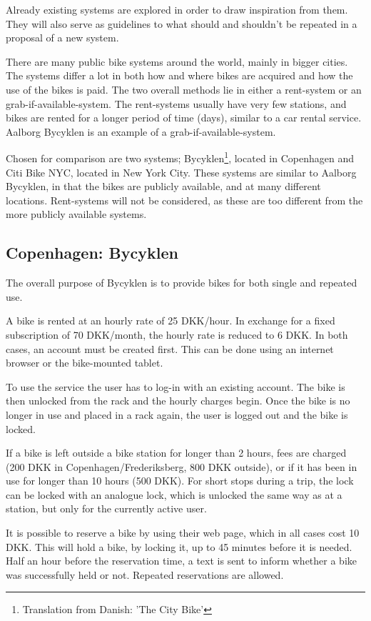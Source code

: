 Already existing systems are explored in order to draw inspiration from them.
They will also serve as guidelines to what should and shouldn't be repeated in a proposal of a new system.

There are many public bike systems around the world, mainly in bigger cities.
The systems differ a lot in both how and where bikes are acquired and how the use of the bikes is paid.
The two overall methods lie in either a rent-system or an grab-if-available-system.
The rent-systems usually have very few stations, and bikes are rented for a longer period of time (days), similar to a car rental service.
Aalborg Bycyklen is an example of a grab-if-available-system.

Chosen for comparison are two systems; Bycyklen\footnote{Translation from Danish: 'The City Bike'}, located in Copenhagen and Citi Bike NYC, located in New York City.
These systems are similar to Aalborg Bycyklen, in that the bikes are publicly available, and at many different locations.
Rent-systems will not be considered, as these are too different from the more publicly available systems.

\subsection{Copenhagen: Bycyklen}
The overall purpose of Bycyklen\cite{cph_bycyklen}\cite{cph_bycyklen_conditions} is to provide bikes for both single and repeated use.

A bike is rented at an hourly rate of 25 DKK/hour.
In exchange for a fixed subscription of 70 DKK/month, the hourly rate is reduced to 6 DKK.
In both cases, an account must be created first.
This can be done using an internet browser or the bike-mounted tablet.

To use the service the user has to log-in with an existing account.
The bike is then unlocked from the rack and the hourly charges begin.
Once the bike is no longer in use and placed in a rack again, the user is logged out and the bike is locked.

If a bike is left outside a bike station for longer than 2 hours, fees are charged (200 DKK in Copenhagen/Frederiksberg, 800 DKK outside), or if it has been in use for longer than 10 hours (500 DKK).
For short stops during a trip, the lock can be locked with an analogue lock, which is unlocked the same way as at a station, but only for the currently active user.

It is possible to reserve a bike by using their web page, which in all cases cost 10 DKK.
This will hold a bike, by locking it, up to 45 minutes before it is needed.
Half an hour before the reservation time, a text is sent to inform whether a bike was successfully held or not.
Repeated reservations are allowed.

